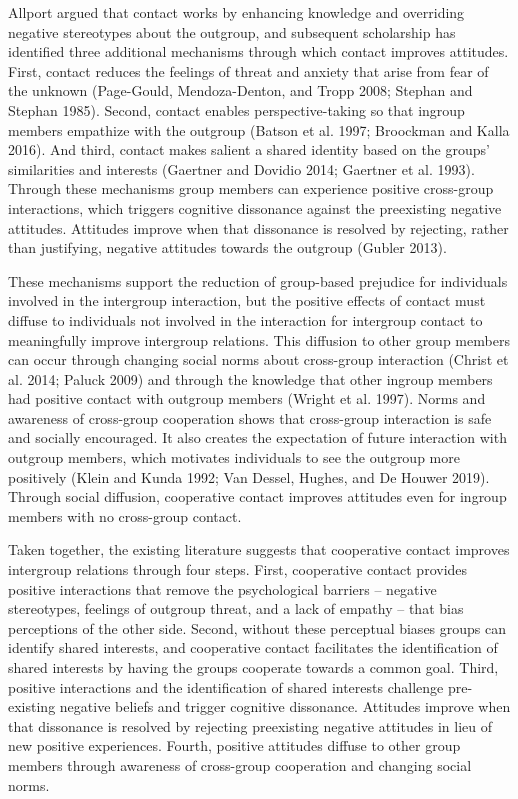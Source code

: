 \documentclass[11pt]{article}
\begin{document}
Allport argued that contact works by enhancing knowledge and overriding
negative stereotypes about the outgroup, and subsequent scholarship has
identified three additional mechanisms through which contact improves
attitudes. First, contact reduces the feelings of threat and anxiety
that arise from fear of the unknown (Page-Gould, Mendoza-Denton, and
Tropp 2008; Stephan and Stephan 1985). Second, contact enables
perspective-taking so that ingroup members empathize with the outgroup
(Batson et al. 1997; Broockman and Kalla 2016). And third, contact makes
salient a shared identity based on the groups' similarities and
interests (Gaertner and Dovidio 2014; Gaertner et al. 1993). Through
these mechanisms group members can experience positive cross-group
interactions, which triggers cognitive dissonance against the
preexisting negative attitudes. Attitudes improve when that dissonance
is resolved by rejecting, rather than justifying, negative attitudes
towards the outgroup (Gubler 2013).

These mechanisms support the reduction of group-based prejudice for
individuals involved in the intergroup interaction, but the positive
effects of contact must diffuse to individuals not involved in the
interaction for intergroup contact to meaningfully improve intergroup
relations. This diffusion to other group members can occur through
changing social norms about cross-group interaction (Christ et al. 2014;
Paluck 2009) and through the knowledge that other ingroup members had
positive contact with outgroup members (Wright et al. 1997). Norms and
awareness of cross-group cooperation shows that cross-group interaction
is safe and socially encouraged. It also creates the expectation of
future interaction with outgroup members, which motivates individuals to
see the outgroup more positively (Klein and Kunda 1992; Van Dessel,
Hughes, and De Houwer 2019). Through social diffusion, cooperative
contact improves attitudes even for ingroup members with no cross-group
contact.

Taken together, the existing literature suggests that cooperative
contact improves intergroup relations through four steps. First,
cooperative contact provides positive interactions that remove the
psychological barriers -- negative stereotypes, feelings of outgroup
threat, and a lack of empathy -- that bias perceptions of the other
side. Second, without these perceptual biases groups can identify shared
interests, and cooperative contact facilitates the identification of
shared interests by having the groups cooperate towards a common goal.
Third, positive interactions and the identification of shared interests
challenge pre-existing negative beliefs and trigger cognitive
dissonance. Attitudes improve when that dissonance is resolved by
rejecting preexisting negative attitudes in lieu of new positive
experiences. Fourth, positive attitudes diffuse to other group members
through awareness of cross-group cooperation and changing social norms.
\end{document}
